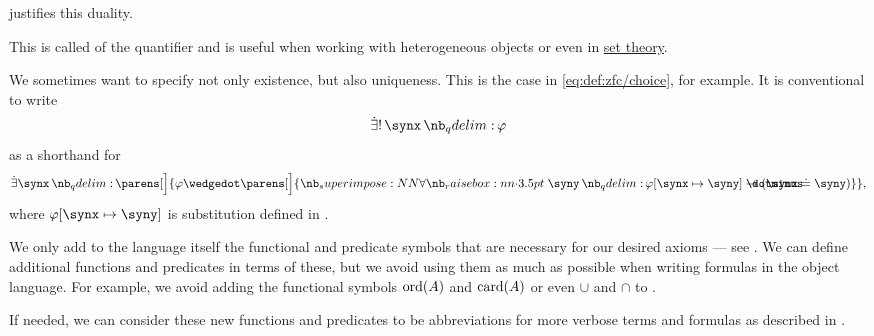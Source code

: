 \begin{remark}
\begin{thmenum}
     justifies this duality.

    This is called  of the quantifier and is useful when working with heterogeneous objects or even in \hyperref[ch:set_theory]{set theory}.

     We sometimes want to specify not only existence, but also uniqueness. This is the case in \eqref{eq:def:zfc/choice}, for example. It is conventional to write
    \begin{equation*}
      \qExists \synx \varphi
    \end{equation*}
    as a shorthand for
    \begin{equation*}
      \qexists \synx \parens[\Big]{ \varphi \synwedge \parens[\Big]{ \qforall \syny \varphi[\synx \mapsto \syny] \synimplies (\synx \syneq \syny) } },
    \end{equation*}
    where \( \varphi[\synx \mapsto \syny] \) is substitution defined in .

     We only add to the language itself the functional and predicate symbols that are necessary for our desired axioms --- see . We can define additional functions and predicates in terms of these, but we avoid using them as much as possible when writing formulas in the object language. For example, we avoid adding the functional symbols \hyperref[thm:well_ordered_order_type_existence]{\( \operatorname{ord}(A) \)} and \hyperref[def:cardinal]{\( \operatorname{card}(A) \)} or even \hyperref[def:basic_set_operations/union]{\( \cup \)} and \hyperref[def:basic_set_operations/intersection]{\( \cap \)} to \hyperref[def:zfc]{}.

    If needed, we can consider these new functions and predicates to be abbreviations for more verbose terms and formulas as described in .
  \end{thmenum}
\end{remark}

